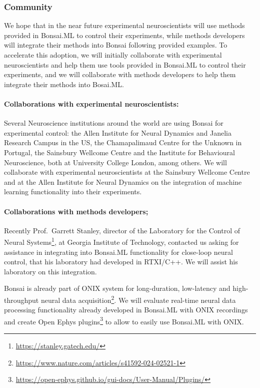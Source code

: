 \subsubsection*{Community}

We hope that in the near future experimental neuroscientists will use methods
provided in Bonsai.ML to control their experiments, while methods developers
will integrate their methods into Bonsai following provided examples. To
accelerate this adoption, we will initially collaborate with experimental
neuroscientists and help them use tools provided in Bonsai.ML to control their
experiments, and we will collaborate with methods developers to help them
integrate their methods into Bosai.ML.

\paragraph{Collaborations with experimental neuroscientists:} Several
Neuroscience institutions around the world are using Bonsai for experimental
control: the Allen Institute for Neural Dynamics and Janelia Research Campus in
the US, the Chamapalimaud Centre for the Unknown in Portugal, the Sainsbury
Wellcome Centre and the Institute for Behavioural Neuroscience, both at
University College London, among others. We will collaborate with experimental
neuroscientists at the Sainsbury Wellcome Centre and at the Allen Institute
for Neural Dynamics on the integration of machine learning functionality into
their experiments.

\paragraph{Collaborations with methods developers;} Recently Prof.~Garrett
Stanley, director of the Laboratory for the Control of Neural
Systems\footnote[11]{\url{https://stanley.gatech.edu/}}, at Georgia Institute
of Technology, contacted us asking for assistance in integrating into Bonsai.ML
functionality for close-loop neural control, that his laboratory had developed
in RTXI/C++. We will assist his laboratory on this integration.

%

Bonsai is already part of ONIX system for long-duration, low-latency and
high-throughput neural data
acquisition\footnote[13]{\url{https://www.nature.com/articles/s41592-024-02521-1}}.  We
will evaluate real-time neural data processing functionality already developed
in Bonsai.ML with ONIX recordings and create Open Ephys
plugins\footnote[14]{\url{https://open-ephys.github.io/gui-docs/User-Manual/Plugins/}} to
allow to easily use Bonsai.ML with ONIX.

